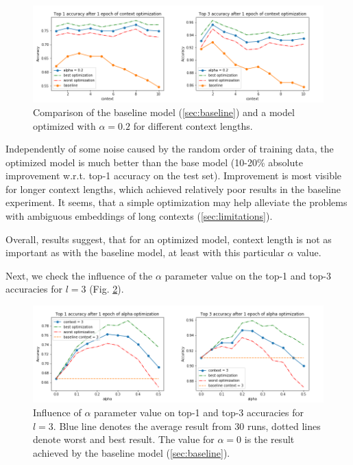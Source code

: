 \documentclass{llncs}
\begin{document}
\begin{figure}[H]
    \centering
    \caption{Comparison of the baseline model (\ref{sec:baseline}) and a model optimized with \(\alpha=0.2\) for different context lengths.}
    \label{fig:exp1_optimization}
    \includegraphics[scale=0.6]{res/exp1_context_top_acc.png}
\end{figure}

Independently of some noise caused by the random order of training data, the optimized model is much better than the base model (10-20\% absolute improvement w.r.t. top-1 accuracy on the test set).
Improvement is most visible for longer context lengths, which achieved relatively poor results in the baseline experiment.
It seems, that a simple optimization may help alleviate the problems with ambiguous embeddings of long contexts (\ref{sec:limitations}).

Overall, results suggest, that for an optimized model, context length is not as important as with the baseline model, at least with this particular \(\alpha\) value.

\bigskip
Next, we check the influence of the \(\alpha\) parameter value on the top-1 and top-3 accuracies for \(l=3\) (Fig. \ref{fig:exp2_alpha}).

\begin{figure}
    \centering
    \caption{Influence of \(\alpha\) parameter value on top-1 and top-3 accuracies for \(l=3\). Blue line denotes the average result from 30 runs, dotted lines denote worst and best result. The value for \(\alpha=0\) is the result achieved by the baseline model (\ref{sec:baseline}).}
    \label{fig:exp2_alpha}
    \includegraphics[scale=0.6]{res/exp2_alpha_top_acc.png}
\end{figure}
\end{document}
